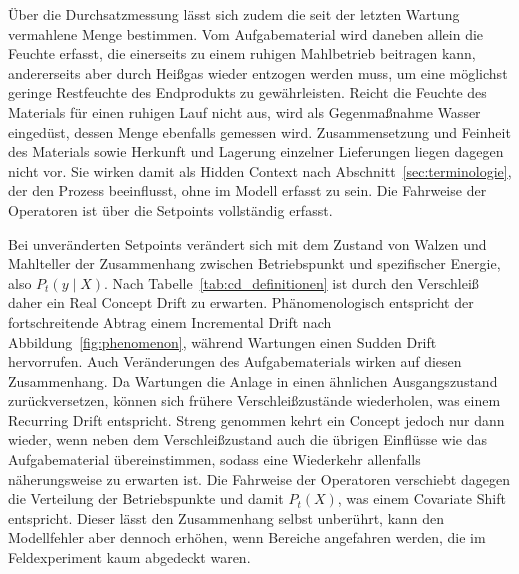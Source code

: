 %
Über die Durchsatzmessung lässt sich zudem die seit der letzten Wartung vermahlene Menge bestimmen. Vom Aufgabematerial wird daneben allein die Feuchte erfasst, die einerseits zu einem ruhigen Mahlbetrieb beitragen kann, andererseits aber durch Heißgas wieder entzogen werden muss, um eine möglichst geringe Restfeuchte des Endprodukts zu gewährleisten. Reicht die Feuchte des Materials für einen ruhigen Lauf nicht aus, wird als Gegenmaßnahme Wasser eingedüst, dessen Menge ebenfalls gemessen wird. Zusammensetzung und Feinheit des Materials sowie Herkunft und Lagerung einzelner Lieferungen liegen dagegen nicht vor. Sie wirken damit als Hidden Context nach Abschnitt~\ref{sec:terminologie}, der den Prozess beeinflusst, ohne im Modell erfasst zu sein. Die Fahrweise der Operatoren ist über die Setpoints vollständig erfasst. \par
%
Bei unveränderten Setpoints verändert sich mit dem Zustand von Walzen und Mahlteller der Zusammenhang zwischen Betriebspunkt und spezifischer Energie, also $P_t(y \mid X)$. Nach Tabelle~\ref{tab:cd_definitionen} ist durch den Verschleiß daher ein Real Concept Drift zu erwarten. Phänomenologisch entspricht der fortschreitende Abtrag einem Incremental Drift nach Abbildung~\ref{fig:phenomenon}, während Wartungen einen Sudden Drift hervorrufen. 
Auch Veränderungen des Aufgabematerials wirken auf diesen Zusammenhang. Da Wartungen die Anlage in einen ähnlichen Ausgangszustand zurückversetzen, können sich frühere Verschleißzustände wiederholen, was einem Recurring Drift entspricht. Streng genommen kehrt ein Concept jedoch nur dann wieder, wenn neben dem Verschleißzustand auch die übrigen Einflüsse wie das Aufgabematerial übereinstimmen, sodass eine Wiederkehr allenfalls näherungsweise zu erwarten ist. Die Fahrweise der Operatoren verschiebt dagegen die Verteilung der Betriebspunkte und damit $P_t(X)$, was einem Covariate Shift entspricht. Dieser lässt den Zusammenhang selbst unberührt, kann den Modellfehler aber dennoch erhöhen, wenn Bereiche angefahren werden, die im Feldexperiment kaum abgedeckt waren. \par
%
